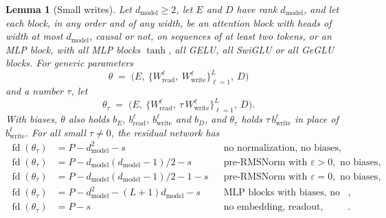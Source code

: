 \documentclass[10pt]{article}
\newtheorem{lemma}[theorem]{Lemma}
\theoremstyle{definition}
\theoremstyle{remark}
\newcommand{\Wread}{W_{\mathrm{read}}}
\newcommand{\Wwrite}{W_{\mathrm{write}}}
\newcommand{\dm}{d_{\mathrm{model}}}
\begin{document}
\begin{lemma}[Small writes]\label{lem:smallwrites}
Let $\dm \ge 2$, let $E$ and $D$ have rank $\dm$, and let each block, in any order and of any width, be an attention block with heads of width at most $\dm$, causal or not, on sequences of at least two tokens, or an MLP block, with all MLP blocks $\tanh$, all GELU, all SwiGLU or all GeGLU blocks. For generic parameters
\[
\theta \;=\; \Big(E,\ \big\{\Wread^{\ell},\ \Wwrite^{\ell}\big\}_{\ell=1}^{L},\ D\Big)
\]
and a number $\tau$, let
\[
\theta_\tau \;=\; \Big(E,\ \big\{\Wread^{\ell},\ \tau\,\Wwrite^{\ell}\big\}_{\ell=1}^{L},\ D\Big).
\]
With biases, $\theta$ also holds $b_E$, $b^{\ell}_{\mathrm{read}}$, $b^{\ell}_{\mathrm{write}}$ and $b_D$, and $\theta_\tau$ holds $\tau\,b^{\ell}_{\mathrm{write}}$ in place of $b^{\ell}_{\mathrm{write}}$. For all small $\tau \neq 0$, the residual network has
\begin{align*}
\operatorname{fd}(\theta_\tau) &= P - \dm^2 - s && \text{no normalization, no biases},\\
\operatorname{fd}(\theta_\tau) &= P - \dm(\dm-1)/2 - s && \text{pre-RMSNorm with } \varepsilon > 0, \text{ no biases},\\
\operatorname{fd}(\theta_\tau) &= P - \dm(\dm-1)/2 - 1 - s && \text{pre-RMSNorm with } \varepsilon = 0, \text{ no biases},\\
\operatorname{fd}(\theta_\tau) &= P - \dm^2 - (L+1)\dm - s && \text{MLP blocks with biases, no normalization},\\
\operatorname{fd}(\theta_\tau) &= P - s && \text{no embedding, readout, biases or normalization}.
\end{align*}
\end{lemma}
\end{document}
